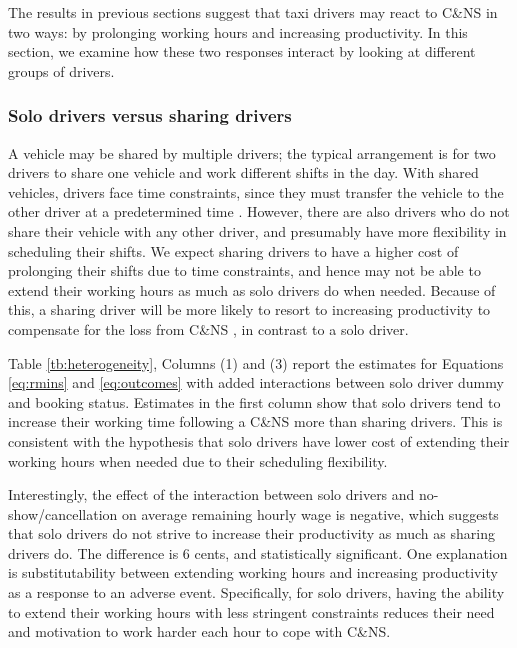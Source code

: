 \documentclass[reviewmode]{restat}
\begin{document}
The results in previous sections suggest that taxi drivers may react to C\&NS in two ways: by prolonging 
working hours and increasing productivity. In this section, we examine how these two responses interact 
by looking at different groups of drivers.

\subsubsection{Solo drivers versus sharing drivers}

A vehicle may be shared by multiple drivers; the typical %
arrangement is for two drivers to share one 
vehicle and work different shifts in the day. With shared vehicles, drivers face time constraints, 
since they must transfer the vehicle to the other driver at a predetermined time%
. However, there are also drivers who do not share their vehicle with any 
other driver, and presumably have more flexibility in scheduling their shifts.
We expect sharing drivers to have a higher cost of prolonging their shifts due to time constraints, 
and hence may not be able to extend their working hours as much as solo drivers do when needed. 
Because of this, a sharing driver will be more likely to resort to increasing productivity to compensate 
for the loss from C\&NS%
, in contrast to a solo driver.

Table \ref{tb:heterogeneity}, Columns (1) and (3) report the estimates for Equations \eqref{eq:rmins} 
and \eqref{eq:outcomes} with added interactions between solo driver dummy and booking status. Estimates
in the first column show that solo drivers tend to increase their working time following a C\&NS more
than sharing drivers. This is consistent with the hypothesis that solo drivers have lower cost of extending
their working hours when needed due to their scheduling flexibility.

Interestingly, the effect of the interaction between solo drivers and no-show/cancellation on average
remaining hourly wage is negative, which suggests that solo drivers do not strive to increase their 
productivity as much as sharing drivers do. The difference is 6 cents, and statistically significant.
One explanation is substitutability between extending working hours and increasing productivity as a 
response to an adverse event. Specifically, for solo drivers, having the ability to extend their working
hours with less stringent constraints reduces their need and motivation to work harder each hour to cope
with C\&NS.
\end{document}

